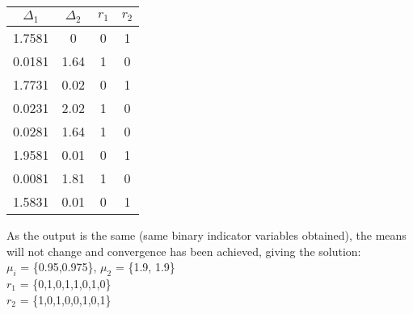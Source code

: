 \documentclass{article}
\begin{document}
\begin{center}
 \begin{tabular}{||c c c c||} 
 \hline
 $\Delta_1$ & $\Delta_2$ & $r_1$ & $r_2$  \\ [0.5ex] 
 \hline\hline
 1.7581 & 0 & 0 & 1 \\ 
 \hline
 0.0181 & 1.64  & 1 & 0 \\ 
 \hline
1.7731 & 0.02 & 0 & 1 \\
 \hline
0.0231 & 2.02 & 1 & 0 \\
 \hline
 0.0281 & 1.64 & 1 & 0 \\ 
  \hline
1.9581 & 0.01 & 0 & 1 \\
 \hline
0.0081 & 1.81 & 1 & 0 \\
 \hline
 1.5831 & 0.01 & 0 & 1 \\ [1ex] 
 \hline
\end{tabular}
\end{center}
As the output is the same (same binary indicator variables obtained), the means will not change and convergence has been achieved, giving the solution: \\
$\mu_i$ = \{0.95,0.975\}, $\mu_2$ = \{1.9, 1.9\} \\
$r_1$ = \{0,1,0,1,1,0,1,0\} \\
$r_2$ = \{1,0,1,0,0,1,0,1\} \\
\end{document}

